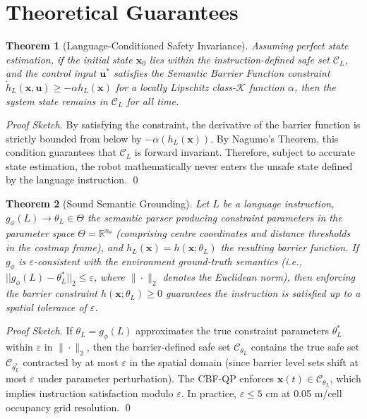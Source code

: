 \documentclass[conference]{IEEEtran}
\newtheorem{theorem}{Theorem}
\begin{document}
\section{Theoretical Guarantees}

\begin{theorem}[Language-Conditioned Safety Invariance]
\label{thm:invariance}
Assuming perfect state estimation, if the initial state $\mathbf{x}_0$ lies within the instruction-defined safe set $\mathcal{C}_L$, and the control input $\mathbf{u}^*$ satisfies the Semantic Barrier Function constraint $\dot{h}_L(\mathbf{x}, \mathbf{u}) \ge -\alpha h_L(\mathbf{x})$ for a locally Lipschitz class-$\mathcal{K}$ function $\alpha$, then the system state remains in $\mathcal{C}_L$ for all time.
\end{theorem}
\begin{proof}[Proof Sketch]
By satisfying the constraint, the derivative of the barrier function is strictly bounded from below by $-\alpha(h_L(\mathbf{x}))$. By Nagumo's Theorem, this condition guarantees that $\mathcal{C}_L$ is forward invariant. Therefore, subject to accurate state estimation, the robot mathematically never enters the unsafe state defined by the language instruction. \qed
\end{proof}

\begin{theorem}[Sound Semantic Grounding]
\label{thm:grounding}
Let $L$ be a language instruction, $g_\phi(L) \rightarrow \theta_L \in \Theta$ the semantic parser producing constraint parameters in the parameter space $\Theta = \mathbb{R}^{n_\theta}$ (comprising centre coordinates and distance thresholds in the costmap frame), and $h_L(\mathbf{x}) = h(\mathbf{x}; \theta_L)$ the resulting barrier function. If $g_\phi$ is $\varepsilon$-consistent with the environment ground-truth semantics (i.e., $||g_\phi(L) - \theta^*_L||_2 \le \varepsilon$, where $\|\cdot\|_2$ denotes the Euclidean norm), then enforcing the barrier constraint $h(\mathbf{x}; \theta_L) \ge 0$ guarantees the instruction is satisfied up to a spatial tolerance of $\varepsilon$.
\end{theorem}
\begin{proof}[Proof Sketch]
If $\theta_L = g_\phi(L)$ approximates the true constraint parameters $\theta^*_L$ within $\varepsilon$ in $\|\cdot\|_2$, then the barrier-defined safe set $\mathcal{C}_{\theta_L}$ contains the true safe set $\mathcal{C}_{\theta^*_L}$ contracted by at most $\varepsilon$ in the spatial domain (since barrier level sets shift at most $\varepsilon$ under parameter perturbation). The CBF-QP enforces $\mathbf{x}(t) \in \mathcal{C}_{\theta_L}$, which implies instruction satisfaction modulo $\varepsilon$. In practice, $\varepsilon \le 5$ cm at 0.05 m/cell occupancy grid resolution. \qed
\end{proof}
\end{document}
